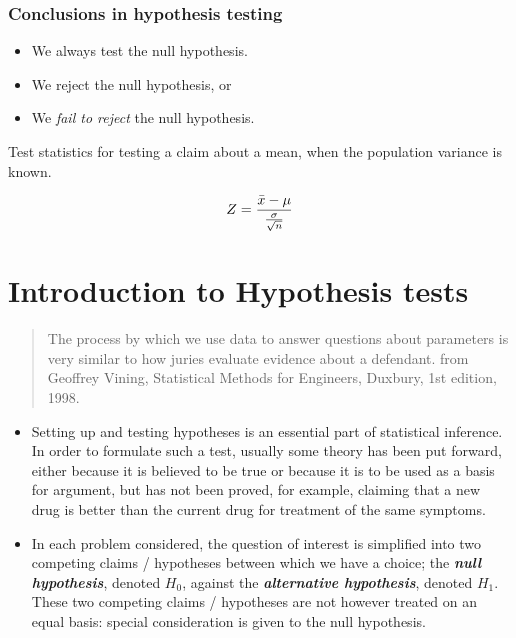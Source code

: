 \documentclass[]{report}
\begin{document}
{
\subsubsection{Conclusions in hypothesis testing}
\begin{itemize}
\item We always test the null hypothesis.
\item We reject the null hypothesis, or
\item We \emph{ fail to reject} the null hypothesis.
\end{itemize}

{

Test statistics for testing a claim about a mean, when the population variance is known.

\[ Z = {\bar{x}  - \mu \over {\sigma \over \sqrt{n}}} \]
}




\newpage

\section{Introduction to Hypothesis tests}

\begin{framed}
\begin{quote}
The process by which we use data to answer questions about parameters
is very similar to how juries evaluate evidence about a defendant. from
Geoffrey Vining, Statistical Methods for Engineers, Duxbury, 1st edition,
1998.
\end{quote}
\end{framed}





\begin{itemize}
\item Setting up and testing hypotheses is an essential part of statistical inference. In order to formulate such a test, usually some theory has been put forward, either because it is believed to be true or because it is to be used as a basis for argument, but has not been proved, for example, claiming that a new drug is better than the current drug for treatment of the same symptoms.

\item In each problem considered, the question of interest is simplified into two competing claims / hypotheses between which we have a choice; the \textit{\textbf{null hypothesis}}, denoted $H_0$, against the \textit{\textbf{alternative hypothesis}}, denoted $H_1$. These two competing claims / hypotheses are not however treated on an equal basis: special consideration is given to the null hypothesis.


\end{itemize}}
\end{document}
